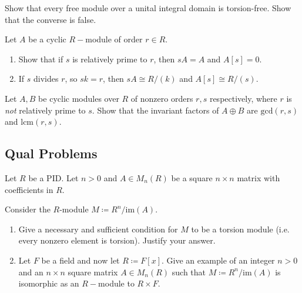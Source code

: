 \begin{problem}[Hungerford 4.6.2]
\label{prob:1.1}
Show that every free module over a unital integral domain is torsion-free. Show that the converse is false.
\end{problem}

\begin{problem}[Hungerford 4.6.3]
\label{prob:1.1}
Let $A$ be a cyclic $R-$module of order $r \in R$.
\begin{enumerate}
    \item Show that if $s$ is relatively prime to $r$, then $sA = A$ and $A[s] = 0$.
    \item If $s$ divides $r$, so $sk = r$, then $sA \cong R/(k)$ and $A[s] \cong R/(s)$.
\end{enumerate}
\end{problem}

\begin{problem}[Hungerford 4.6.6]
\label{prob:1.1}
Let $A, B$ be cyclic modules over $R$ of nonzero orders $r,s$ respectively, where $r$ is \textit{not} relatively prime to $s$. Show that the invariant factors of $A \oplus B$ are $\mathrm{gcd}(r, s)$ and $\mathrm{lcm}(r, s)$.
\end{problem}

\newpage
\subsection{Qual Problems}

\begin{problem}
\label{prob:1.1}
Let $R$ be a PID. Let $n > 0$ and $A \in M_n(R)$ be a square $n\times n$ matrix with coefficients in $R$.

Consider the $R$-module $M \coloneqq R^n / \mathrm{im}(A)$.

\begin{enumerate}
    \item Give a necessary and sufficient condition for $M$ to be a torsion module (i.e. every nonzero element is torsion).
    Justify your answer.
    
    \item Let $F$ be a field and now let $R \coloneqq F[x]$. Give an example of an integer $n>0$ and an $n \times n$ square matrix $A \in M_n(R)$ such that $M \coloneqq R^n/\mathrm{im}(A)$ is isomorphic as an $R-$module to $R \times F$.
\end{enumerate}
\end{problem}

